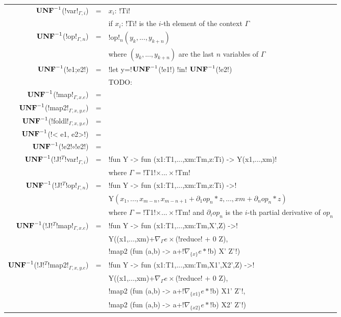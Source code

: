 \begin{figure*}[t]
    \begin{tabular}{r c l}
    $\mathbf{UNF}^{-1}$(!var!$_{\Gamma,i}$) &=& $x_i$: !Ti! \\
    && if $x_i$: !Ti! is the $i$-th element of the context $\Gamma$ \\
    $\mathbf{UNF}^{-1}$(!op!$_{\Gamma,n}$) &=& !op!$_n(y_k,...,y_{k+n})$ \\
    && where $(y_k,...,y_{k+n})$ are the last $n$ variables of $\Gamma$ \\ 
    $\mathbf{UNF}^{-1}$(!e1;e2!) &=& !let y=!$\mathbf{UNF}^{-1}$(!e1!) !in! $\mathbf{UNF}^{-1}$(!e2!) \\ 
    && TODO: \\ 
    $\mathbf{UNF}^{-1}$(!map!$_{\Gamma,x.e}$) &=&  \\ 
    $\mathbf{UNF}^{-1}$(!map2!$_{\Gamma,x,y.e}$) &=&  \\ 
    $\mathbf{UNF}^{-1}$(!foldl!$_{\Gamma,x,y.e}$) &=&  \\ 
    $\mathbf{UNF}^{-1}$(!< e1, e2>!) &=&  \\ 
    $\mathbf{UNF}^{-1}$(!e2!$\circ$!e2!) &=& \\
    $\mathbf{UNF}^{-1}$(!J!$^T$!var!$_{\Gamma,i}$) &=& !fun Y -> fun (x1:T1,...,xm:Tm,z:Ti) -> Y(x1,...,xm)! \\
    &&where $\Gamma=$!T1!$\times...\times$!Tm! \\
    $\mathbf{UNF}^{-1}$(!J!$^T$!op!$_{\Gamma,n}$) &=& !fun Y -> fun (x1:T1,...,xm:Tm,z:Ti) ->!\\ 
    && Y$(x_1,...,x_{m-n},x_{m-n+1}+\partial_1op_n*z,...,xm+\partial_nop_n*z)$ \\
    && where $\Gamma=$!T1!$\times...\times$!Tm! and $\partial_iop_n$ is the $i$-th partial derivative of $op_n$ \\
    $\mathbf{UNF}^{-1}$(!J!$^T$!map!$_{\Gamma,x.e}$) &=&  !fun Y -> fun (x1:T1,...,xm:Tm,X',Z) ->!\\
    && Y((x1,...,xm)+$\nabla_{\Gamma}e \times$(!reduce! + 0 Z),\\
    && !map2 (fun (a,b) -> a+!$\nabla_{\{x\}}e *$!b) X' Z'!) \\
    $\mathbf{UNF}^{-1}$(!J!$^T$!map2!$_{\Gamma,x,y.e}$) &=&  !fun Y -> fun (x1:T1,...,xm:Tm,X1',X2',Z) ->!\\
    && Y((x1,...,xm)+$\nabla_{\Gamma}e \times$(!reduce! + 0 Z),\\
    && !map2 (fun (a,b) -> a+!$\nabla_{\{x1\}}e *$!b) X1' Z'!, \\
    && !map2 (fun (a,b) -> a+!$\nabla_{\{x2\}}e *$!b) X2' Z'!) \\

\end{tabular}
\end{figure*}
